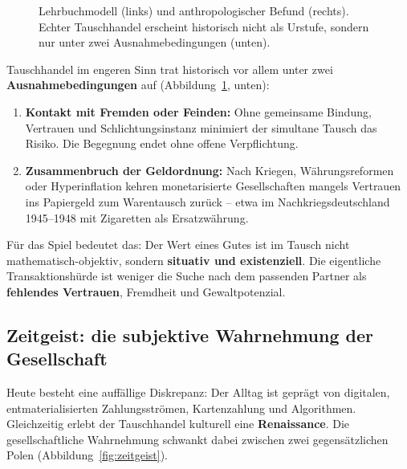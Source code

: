 \documentclass[11pt, a4paper]{article}
\begin{document}
\begin{figure}[H]
\caption[Lehrbuchmodell versus anthropologischer Befund]{Lehrbuchmodell
(links) und anthropologischer Befund (rechts). Echter Tauschhandel erscheint
historisch nicht als Urstufe, sondern nur unter zwei Ausnahmebedingungen
(unten).}
\label{fig:mythos}
\end{figure}

Tauschhandel im engeren Sinn trat historisch vor allem unter zwei
\textbf{Ausnahmebedingungen} auf (Abbildung~\ref{fig:mythos}, unten):
\begin{enumerate}
    \item \textbf{Kontakt mit Fremden oder Feinden:} Ohne gemeinsame Bindung,
          Vertrauen und Schlichtungsinstanz minimiert der simultane Tausch das
          Risiko. Die Begegnung endet ohne offene Verpflichtung.
    \item \textbf{Zusammenbruch der Geldordnung:} Nach Kriegen, Währungsreformen
          oder Hyperinflation kehren monetarisierte Gesellschaften mangels
          Vertrauen ins Papiergeld zum Warentausch zurück -- etwa im
          Nachkriegsdeutschland 1945--1948 mit Zigaretten als Ersatzwährung.
\end{enumerate}
Für das Spiel bedeutet das: Der Wert eines Gutes ist im Tausch nicht
mathematisch-objektiv, sondern \textbf{situativ und existenziell}. Die
eigentliche Transaktionshürde ist weniger die Suche nach dem passenden Partner
als \textbf{fehlendes Vertrauen}, Fremdheit und Gewaltpotenzial.

\subsection{Zeitgeist: die subjektive Wahrnehmung der Gesellschaft}
\label{sec:zeitgeist}

Heute besteht eine auffällige Diskrepanz: Der Alltag ist geprägt von
digitalen, entmaterialisierten Zahlungsströmen, Kartenzahlung und Algorithmen.
Gleichzeitig erlebt der Tauschhandel kulturell eine \textbf{Renaissance}. Die
gesellschaftliche Wahrnehmung schwankt dabei zwischen zwei gegensätzlichen
Polen (Abbildung~\ref{fig:zeitgeist}).
\end{document}
